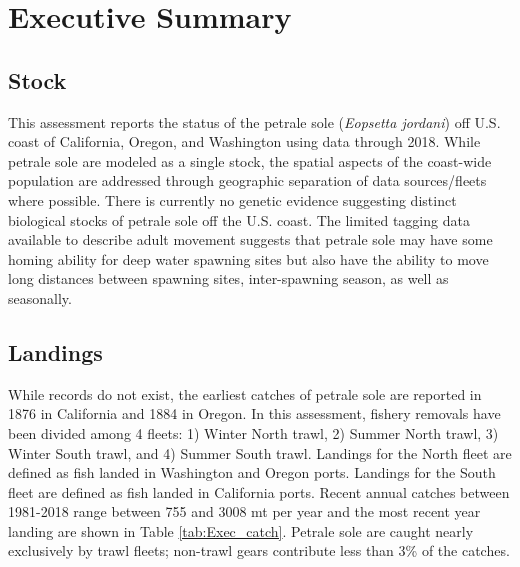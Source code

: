 \documentclass[12pt,]{article}
\begin{document}
\vspace{3cm}



\maketitle


\setcounter{page}{1}

{
\setcounter{tocdepth}{4}
\tableofcontents
}
\setlength{\parskip}{5mm plus1mm minus1mm} \pagebreak

\setcounter{page}{1} \renewcommand{\thefigure}{\alph{figure}}
\renewcommand{\thetable}{\alph{table}}

\section*{Executive Summary}\label{executive-summary}

\subsection*{Stock}\label{stock}

This assessment reports the status of the petrale sole
(\emph{Eopsetta jordani}) off U.S. coast of California, Oregon, and
Washington using data through 2018. While petrale sole are modeled as a
single stock, the spatial aspects of the coast-wide population are
addressed through geographic separation of data sources/fleets where
possible. There is currently no genetic evidence suggesting distinct
biological stocks of petrale sole off the U.S. coast. The limited
tagging data available to describe adult movement suggests that petrale
sole may have some homing ability for deep water spawning sites but also
have the ability to move long distances between spawning sites,
inter-spawning season, as well as seasonally.

\subsection*{Landings}\label{landings}

While records do not exist, the earliest catches of petrale sole are
reported in 1876 in California and 1884 in Oregon. In this assessment,
fishery removals have been divided among 4 fleets: 1) Winter North
trawl, 2) Summer North trawl, 3) Winter South trawl, and 4) Summer South
trawl. Landings for the North fleet are defined as fish landed in
Washington and Oregon ports. Landings for the South fleet are defined as
fish landed in California ports. Recent annual catches between 1981-2018
range between 755 and 3008 mt per year and the most recent year landing
are shown in Table \ref{tab:Exec_catch}. Petrale sole are caught nearly
exclusively by trawl fleets; non-trawl gears contribute less than 3\% of
the catches.
\end{document}
